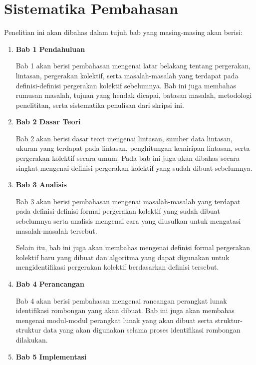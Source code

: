 \section{Sistematika Pembahasan}
\label{sec:sispem}

Penelitian ini akan dibahas dalam tujuh bab yang masing-masing akan berisi:

\begin{enumerate}
    \item \textbf{Bab 1 Pendahuluan}
    
    Bab 1 akan berisi pembahasan mengenai latar belakang tentang pergerakan, lintasan, pergerakan kolektif, serta masalah-masalah yang terdapat pada definisi-definisi pergerakan kolektif sebelumnya. Bab ini juga membahas rumusan masalah, tujuan yang hendak dicapai, batasan masalah, metodologi penelititan, serta sistematika penulisan dari skripsi ini.
    
    \item \textbf{Bab 2 Dasar Teori}
    
    Bab 2 akan berisi dasar teori mengenai lintasan, sumber data lintasan, ukuran yang terdapat pada lintasan, penghitungan kemiripan lintasan, serta pergerakan kolektif secara umum. Pada bab ini juga akan dibahas secara singkat mengenai definisi pergerakan kolektif yang sudah dibuat sebelumnya.
    
    \item \textbf{Bab 3 Analisis}
    
    Bab 3 akan berisi pembahasan mengenai masalah-masalah yang terdapat pada definisi-definisi formal pergerakan kolektif yang sudah dibuat sebelumnya serta analisis mengenai cara yang diusulkan untuk mengatasi masalah-masalah tersebut.
    
    Selain itu, bab ini juga akan membahas mengenai definisi formal pergerakan kolektif baru yang dibuat dan algoritma yang dapat digunakan untuk mengidentifikasi pergerakan kolektif berdasarkan definisi tersebut.
    
    \item \textbf{Bab 4 Perancangan}
    
    Bab 4 akan berisi pembahasan mengenai rancangan perangkat lunak identifikasi rombongan yang akan dibuat. Bab ini juga akan membahas mengenai modul-modul perangkat lunak yang akan dibuat serta struktur-struktur data yang akan digunakan selama proses identifikasi rombongan dilakukan.
    
    \item \textbf{Bab 5 Implementasi}
    

\end{enumerate}
